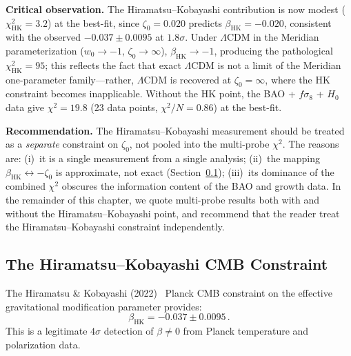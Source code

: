 \textbf{Critical observation.} The Hiramatsu--Kobayashi contribution is now modest ($\chi^2_\mathrm{HK} = 3.2$) at the best-fit, since $\zeta_0 = 0.020$ predicts $\beta_\mathrm{HK} = -0.020$, consistent with the observed $-0.037 \pm 0.0095$ at $1.8\sigma$. Under $\Lambda$CDM in the Meridian parameterization ($w_0 \to -1$, $\zeta_0 \to \infty$), $\beta_\mathrm{HK} \to -1$, producing the pathological $\chi^2_\mathrm{HK} = 95$; this reflects the fact that exact $\Lambda$CDM is not a limit of the Meridian one-parameter family---rather, $\Lambda$CDM is recovered at $\zeta_0 = \infty$, where the HK constraint becomes inapplicable. Without the HK point, the BAO + $f\sigma_8$ + $H_0$ data give $\chi^2 = 19.8$ (23 data points, $\chi^2/N = 0.86$) at the best-fit.

\textbf{Recommendation.} The Hiramatsu--Kobayashi measurement should be treated as a \emph{separate} constraint on $\zeta_0$, not pooled into the multi-probe $\chi^2$. The reasons are: (i)~it is a single measurement from a single analysis; (ii)~the mapping $\beta_\mathrm{HK} \leftrightarrow -\zeta_0$ is approximate, not exact (Section~\ref{sec:2-HK-CMB}); (iii)~its dominance of the combined $\chi^2$ obscures the information content of the BAO and growth data. In the remainder of this chapter, we quote multi-probe results both with and without the Hiramatsu--Kobayashi point, and recommend that the reader treat the Hiramatsu--Kobayashi constraint independently.

\subsection{The Hiramatsu--Kobayashi CMB Constraint}
\label{sec:2-HK-CMB}

The Hiramatsu \& Kobayashi (2022)~\cite{ch2:Hiramatsu2022} Planck CMB constraint on the effective gravitational modification parameter provides:
\begin{equation}
\beta_\mathrm{HK} = -0.037 \pm 0.0095\,.
\label{eq:2-betaHK}
\end{equation}
This is a legitimate $4\sigma$ detection of $\beta \neq 0$ from Planck temperature and polarization data.

\noindent{}

